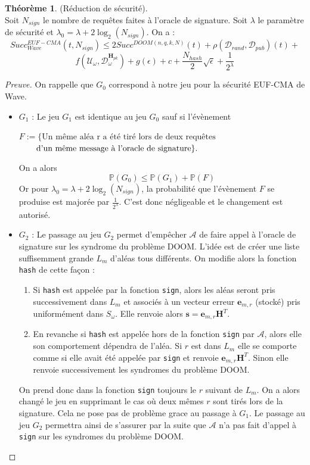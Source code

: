 \documentclass[12pt]{article}
\theoremstyle{definition}
\newtheorem{thm}{Théorème}[section]
\newcommand{\A}{\mathcal{A}}
\newcommand{\e}{\mathbf{e}}
\newcommand{\s}{\mathbf{s}}
\begin{document}
\begin{thm} (Réduction de sécurité). \\
Soit $N_{sign}$ le nombre de requêtes faites à l'oracle de signature. Soit $\lambda$ le paramètre de sécurité et $\lambda_0=\lambda + 2\log_2(N_{sign})$. On a :
$$Succ^{EUF-CMA}_{Wave}(t,N_{sign}) \leq 2Succ^{DOOM(n,q,k,N)}(t) +\rho(\mathcal{D}_{rand},\mathcal{D}_{pub})(t) + $$
$$ f(\mathcal{U}_{\omega},\mathcal{D}_{\omega}^{\mathbf{H}_{pk}}) + g(\epsilon) + c + \frac{N_{hash}}{2}\sqrt{\epsilon} + \frac{1}{2^{\lambda}}$$
\end{thm}

\begin{proof}[Preuve] On rappelle que $G_0$ correspond à notre jeu pour la sécurité EUF-CMA de Wave.
\begin{itemize} 
\item $G_1$ : Le jeu $G_1$ est identique au jeu $G_0$ sauf si l'évènement 
\begin{center}
$F := \{\text{Un même aléa r a été tiré lors de deux requêtes}$
$\text{\qquad d'un même message à l'oracle de signature}\}.$
\end{center}
On a alors 
$$ \mathbb{P}(G_0) \leq  \mathbb{P}(G_1) +  \mathbb{P}(F) $$
Or pour $\lambda_0=\lambda + 2\log_2(N_{sign})$, la probabilité que l'évènement $F$ se produise est majorée par $\frac{1}{2^{\lambda}}$. C'est donc négligeable et le changement est autorisé.
\item $G_2$ : Le passage au jeu $G_2$ permet d'empêcher $\A$ de faire appel à l'oracle de signature sur les syndrome du problème DOOM. L'idée est de créer une liste suffisemment grande $L_m$ d'aléas tous différents. On modifie alors la fonction \verb|hash| de cette façon :
	\begin{enumerate}
	\item Si \verb|hash| est appelée par la fonction \verb|sign|, alors les aléas seront pris successivement dans $L_m$ et associés à un vecteur erreur $\e_{m,r}$ (stocké) pris uniformément dans $S_{\omega}$. Elle renvoie alors $\s=\e_{m,r}\mathbf{H}^T$.
	\item En revanche si \verb|hash| est appelée hors de la fonction \verb|sign| par $\A$, alors elle son comportement dépendra de l'aléa. Si $r$ est dans $L_m$ elle se comporte comme si elle avait été appelée par \verb|sign| et renvoie $\e_{m,r}\mathbf{H}^T$. Sinon elle renvoie successivement les syndromes du problème DOOM.
	\end{enumerate}
On prend donc dans la fonction \verb|sign| toujours le $r$ suivant de $L_m$. On a alors changé le jeu en supprimant le cas où deux mêmes $r$ sont tirés lors de la signature. Cela ne pose pas de problème grace au passage à $G_1$. Le passage au jeu $G_2$ permettra ainsi de s'assurer par la suite que $\A$ n'a pas fait d'appel à \verb|sign| sur les syndromes du problème DOOM.

\end{itemize}
\end{proof}
\end{document}

